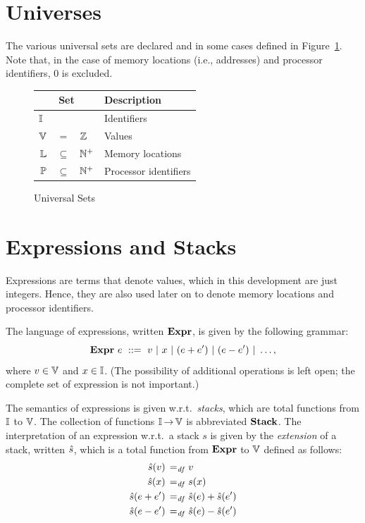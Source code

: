 \documentclass[11pt]{report}
\begin{document}
\section{Universes}

The various universal sets are declared and in some cases defined in Figure~\ref{fig:universes}. Note that, in the case of memory locations (i.e., addresses) and processor identifiers, 0 is excluded. 

\begin{figure}[ht]
	\centering
	\begin{tabular}{rcl|l}
		\multicolumn{3}{c}{Set} & Description \\ \hline
		\multicolumn{3}{l|}{$\mathbb{I}$} & Identifiers \\
		$\mathbb{V}$ & $=$ &  $\mathbb{Z}$ & Values \\
		$\mathbb{L}$ & $\subseteq$  &  $\mathbb{N}^+$ & Memory locations \\
		$\mathbb{P}$ &$\subseteq$ &  $\mathbb{N}^+$ & Processor identifiers
	\end{tabular}
	\caption{\label{fig:universes}Universal Sets}
\end{figure}

\section{Expressions and Stacks}
\label{sec:expressions}

Expressions are terms that denote values, which in this development are just integers. Hence, they are also used later on to denote memory locations and processor identifiers. 

The language of expressions, written $\mathbf{Expr}$, is given by the following grammar: \[ \mathbf{Expr}~e ~::=~ v ~|~ x ~|~ (e + e') ~|~ (e - e') ~|~ \ldots, \] where $v \in \mathbb{V}$ and $x \in \mathbb{I}$. (The possibility of additional operations is left open; the complete set of expression is not important.)

The semantics of expressions is given w.r.t.~\emph{stacks}, which are total functions from $\mathbb{I}$ to $\mathbb{V}$. The collection of functions $\mathbb{I} \operatorname{\rightarrow} \mathbb{V}$ is abbreviated $\mathbf{Stack}$. The interpretation of an expression w.r.t.~a stack $s$ is given by the \emph{extension} of a stack, written $\hat{s}$, which is a total function from $\mathbf{Expr}$ to $\mathbb{V}$ defined as follows: \begin{align*}
    \hat{s}(v) \operatorname{\;=_{\mathit{df}}\;} & v \\
    \hat{s}(x) \operatorname{\;=_{\mathit{df}}\;} & s(x) \\
    \hat{s}(e + e') \operatorname{\;=_{\mathit{df}}\;} & \hat{s}(e) + \hat{s}(e') \\
    \hat{s}(e - e') \operatorname{\;=_{\mathit{df}}\;} & \hat{s}(e) - \hat{s}(e')
\end{align*}  
\end{document}

